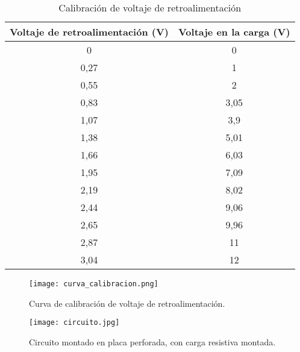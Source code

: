 \begin{table}[H]
    \centering
    \begin{tabular}{|c|c|}
    \hline
    Voltaje de retroalimentación (V) & Voltaje en la carga (V) \\ \hline
    0                                & 0                       \\
    0,27                             & 1                       \\
    0,55                             & 2                       \\
    0,83                             & 3,05                    \\
    1,07                             & 3,9                     \\
    1,38                             & 5,01                    \\
    1,66                             & 6,03                    \\
    1,95                             & 7,09                    \\
    2,19                             & 8,02                    \\
    2,44                             & 9,06                    \\
    2,65                             & 9,96                    \\
    2,87                             & 11                      \\
    3,04                             & 12                      \\ \hline
    \end{tabular}
    \label{tab:calibración_fb}
    \vspace{-0.25cm}
    \caption{Calibración de voltaje de retroalimentación}
\end{table}
\vspace{-0.75cm}

\begin{figure}[H]
    \centering
    \texttt{[image: curva\_calibracion.png]}
    \vspace{-0.25cm}
    \caption{Curva de calibración de voltaje de retroalimentación.}
    \label{fig:calibracion}
\end{figure}
\vspace{-0.5cm}

\begin{figure}[H]
    \centering
    \texttt{[image: circuito.jpg]}
    \vspace{-0.25cm}
    \caption{Circuito montado en placa perforada, con carga resistiva montada.}
    \label{fig:circuito}
\end{figure}
\vspace{-0.5cm}

